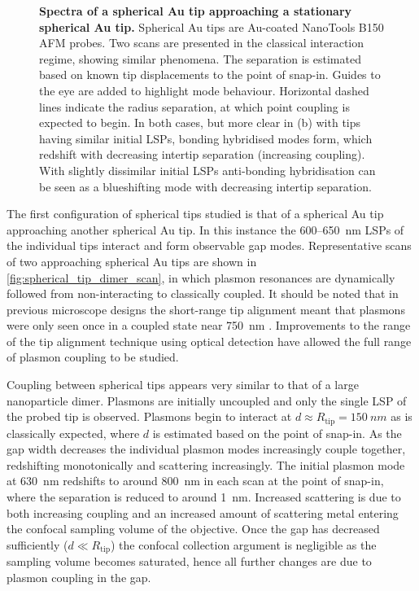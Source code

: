 \documentclass[a4paper]{article}
\begin{document}
\begin{figure}[bt]
\caption[Spectra of a spherical Au tip approaching a stationary spherical Au tip]{\textbf{Spectra of a spherical Au tip approaching a stationary spherical Au tip.} Spherical Au tips are Au-coated NanoTools B150 AFM probes. Two scans are presented in the classical interaction regime, showing similar phenomena. The separation is estimated based on known tip displacements to the point of snap-in. Guides to the eye are added to highlight mode behaviour. Horizontal dashed lines indicate the radius separation, at which point coupling is expected to begin. In both cases, but more clear in (b) with tips having similar initial LSPs, bonding hybridised modes form, which redshift with decreasing intertip separation (increasing coupling). With slightly dissimilar initial LSPs anti-bonding hybridisation can be seen as a blueshifting mode with decreasing intertip separation.}
\label{fig:spherical_tip_dimer_scan}
\end{figure}

The first configuration of spherical tips studied is that of a spherical Au tip approaching another spherical Au tip. In this instance the 600--\SI{650}{nm} LSPs of the individual tips interact and form observable gap modes. Representative scans of two approaching spherical Au tips are shown in \autoref{fig:spherical_tip_dimer_scan}, in which plasmon resonances are dynamically followed from non-interacting to classically coupled. It should be noted that in previous microscope designs the short-range tip alignment meant that plasmons were only seen once in a coupled state near \SI{750}{nm} \cite{savage2012}. Improvements to the range of the tip alignment technique using optical detection have allowed the full range of plasmon coupling to be studied.

Coupling between spherical tips appears very similar to that of a large nanoparticle dimer. Plasmons are initially uncoupled and only the single LSP of the probed tip is observed. Plasmons begin to interact at $d \approx R_{\mathrm{tip}} = \SI{150}{nm}$ as is classically expected, where $d$ is estimated based on the point of snap-in. As the gap width decreases the individual plasmon modes increasingly couple together, redshifting monotonically and scattering increasingly. The initial plasmon mode at \SI{630}{nm} redshifts to around \SI{800}{nm} in each scan at the point of snap-in, where the separation is reduced to around \SI{1}{nm}. Increased scattering is due to both increasing coupling and an increased amount of scattering metal entering the confocal sampling volume of the objective. Once the gap has decreased sufficiently ($d \ll R_{\mathrm{tip}}$) the confocal collection argument is negligible as the sampling volume becomes saturated, hence all further changes are due to plasmon coupling in the gap.
\end{document}

